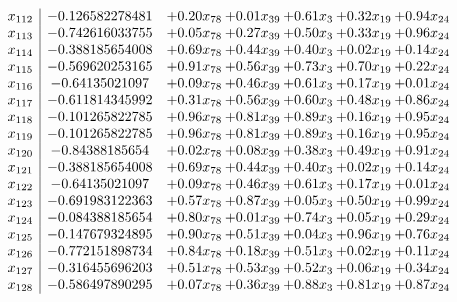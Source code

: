 \documentclass[8pt]{article}
\begin{document}
\[\begin{array}{c| c c@{\hskip 2pt} c@{\hskip 2pt} c@{\hskip 2pt} c@{\hskip 2pt} c@{\hskip 2pt} }
 x_{112}   &  -0.126582278481 & +  0.20 x_{78} & +  0.01 x_{39} & +  0.61 x_{3} & +  0.32 x_{19} & +  0.94 x_{24}\\
 x_{113}   &  -0.742616033755 & +  0.05 x_{78} & +  0.27 x_{39} & +  0.50 x_{3} & +  0.33 x_{19} & +  0.96 x_{24}\\
 x_{114}   &  -0.388185654008 & +  0.69 x_{78} & +  0.44 x_{39} & +  0.40 x_{3} & +  0.02 x_{19} & +  0.14 x_{24}\\
 x_{115}   &  -0.569620253165 & +  0.91 x_{78} & +  0.56 x_{39} & +  0.73 x_{3} & +  0.70 x_{19} & +  0.22 x_{24}\\
 x_{116}   &  -0.64135021097 & +  0.09 x_{78} & +  0.46 x_{39} & +  0.61 x_{3} & +  0.17 x_{19} & +  0.01 x_{24}\\
 x_{117}   &  -0.611814345992 & +  0.31 x_{78} & +  0.56 x_{39} & +  0.60 x_{3} & +  0.48 x_{19} & +  0.86 x_{24}\\
 x_{118}   &  -0.101265822785 & +  0.96 x_{78} & +  0.81 x_{39} & +  0.89 x_{3} & +  0.16 x_{19} & +  0.95 x_{24}\\
 x_{119}   &  -0.101265822785 & +  0.96 x_{78} & +  0.81 x_{39} & +  0.89 x_{3} & +  0.16 x_{19} & +  0.95 x_{24}\\
 x_{120}   &  -0.84388185654 & +  0.02 x_{78} & +  0.08 x_{39} & +  0.38 x_{3} & +  0.49 x_{19} & +  0.91 x_{24}\\
 x_{121}   &  -0.388185654008 & +  0.69 x_{78} & +  0.44 x_{39} & +  0.40 x_{3} & +  0.02 x_{19} & +  0.14 x_{24}\\
 x_{122}   &  -0.64135021097 & +  0.09 x_{78} & +  0.46 x_{39} & +  0.61 x_{3} & +  0.17 x_{19} & +  0.01 x_{24}\\
 x_{123}   &  -0.691983122363 & +  0.57 x_{78} & +  0.87 x_{39} & +  0.05 x_{3} & +  0.50 x_{19} & +  0.99 x_{24}\\
 x_{124}   &  -0.084388185654 & +  0.80 x_{78} & +  0.01 x_{39} & +  0.74 x_{3} & +  0.05 x_{19} & +  0.29 x_{24}\\
 x_{125}   &  -0.147679324895 & +  0.90 x_{78} & +  0.51 x_{39} & +  0.04 x_{3} & +  0.96 x_{19} & +  0.76 x_{24}\\
 x_{126}   &  -0.772151898734 & +  0.84 x_{78} & +  0.18 x_{39} & +  0.51 x_{3} & +  0.02 x_{19} & +  0.11 x_{24}\\
 x_{127}   &  -0.316455696203 & +  0.51 x_{78} & +  0.53 x_{39} & +  0.52 x_{3} & +  0.06 x_{19} & +  0.34 x_{24}\\
 x_{128}   &  -0.586497890295 & +  0.07 x_{78} & +  0.36 x_{39} & +  0.88 x_{3} & +  0.81 x_{19} & +  0.87 x_{24}\\

\end{array}\]
\end{document}
